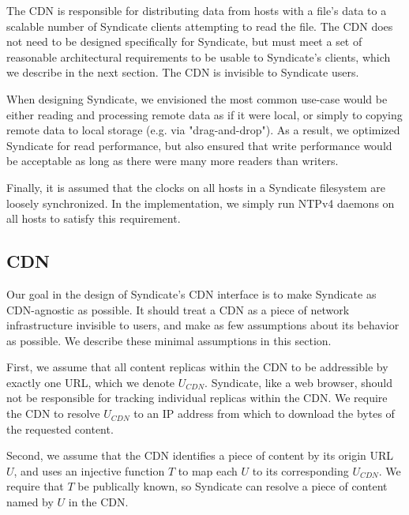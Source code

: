 The CDN is responsible for distributing data from hosts with a file's data to
a scalable number of Syndicate clients attempting to read the file.  The CDN does
not need to be designed specifically for Syndicate, but must meet a set of reasonable
architectural requirements to be usable to Syndicate's clients, which we describe
in the next section.  The CDN is invisible to Syndicate users.

When designing Syndicate, we envisioned the most common use-case would be either reading 
and processing remote data as if it were local, or simply to copying remote data to local 
storage (e.g. via "drag-and-drop").  As a result, we optimized Syndicate for read performance, but also
ensured that write performance would be acceptable as long as there were many more readers than writers.

Finally, it is assumed that the clocks on all hosts in a Syndicate filesystem
are loosely synchronized.  In the implementation, we simply run NTPv4 daemons on all hosts to
satisfy this requirement.


\subsection{CDN}

Our goal in the design of Syndicate's CDN interface is to make Syndicate as CDN-agnostic as possible.  It should treat a CDN as a piece of network infrastructure invisible to users, and make as few assumptions about its behavior as possible.  We describe these minimal assumptions in this section.

First, we assume that all content replicas within the CDN to be addressible by exactly one URL, which we denote $U_{CDN}$.  Syndicate, like a web browser, should not be responsible for tracking individual replicas within the CDN.  We require the CDN to resolve $U_{CDN}$ to an IP address from which to download the bytes of the requested content.

Second, we assume that the CDN identifies a piece of content by its origin URL $U$, and uses an injective function $T$ to map each $U$ to its corresponding $U_{CDN}$.  We require that $T$ be publically known, so Syndicate can resolve a piece of content named by $U$ in the CDN.

